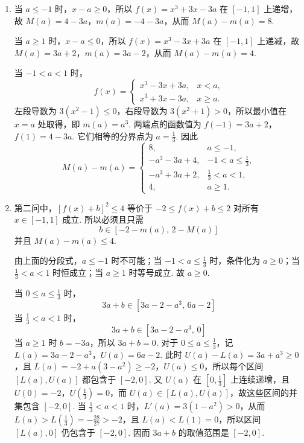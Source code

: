 \begin{solution}
\begin{enumerate}
\item
当 \(a\leqslant-1\) 时，\(x-a\geqslant0\)，所以
\(f(x)=x^3+3x-3a\) 在 \([-1,1]\) 上递增，故
\(M(a)=4-3a\)，\(m(a)=-4-3a\)，从而 \(M(a)-m(a)=8\).

当 \(a\geqslant1\) 时，\(x-a\leqslant0\)，所以
\(f(x)=x^3-3x+3a\) 在 \([-1,1]\) 上递减，故
\(M(a)=3a+2\)，\(m(a)=3a-2\)，从而 \(M(a)-m(a)=4\).

当 \(-1<a<1\) 时，
\[
f(x)=
\begin{cases}
x^3-3x+3a,&x<a,\\
x^3+3x-3a,&x\geqslant a.
\end{cases}
\]
左段导数为 \(3(x^2-1)\leqslant0\)，右段导数为 \(3(x^2+1)>0\)，所以最小值在 \(x=a\) 处取得，即 \(m(a)=a^3\). 两端点的函数值为 \(f(-1)=3a+2\)，\(f(1)=4-3a\). 它们相等的分界点为 \(a=\frac13\). 因此
\[
M(a)-m(a)=
\begin{cases}
8,&a\leqslant-1,\\
-a^3-3a+4,&-1<a\leqslant\frac13,\\
-a^3+3a+2,&\frac13<a<1,\\
4,&a\geqslant1.
\end{cases}
\]

\item
第二问中，\([f(x)+b]^2\leqslant4\) 等价于 \(-2\leqslant f(x)+b\leqslant2\) 对所有 \(x\in[-1,1]\) 成立. 所以必须且只需
\[
b\in[-2-m(a),\,2-M(a)]
\]
并且 \(M(a)-m(a)\leqslant4\).

由上面的分段式，\(a\leqslant-1\) 时不可能；当 \(-1<a\leqslant\frac13\) 时，条件化为 \(a\geqslant0\)；当 \(\frac13<a<1\) 时恒成立；当 \(a\geqslant1\) 时等号成立. 故 \(a\geqslant0\).

当 \(0\leqslant a\leqslant\frac13\) 时，
\[
3a+b\in[3a-2-a^3,\,6a-2]
\]
当 \(\frac13<a<1\) 时，
\[
3a+b\in[3a-2-a^3,\,0]
\]
当 \(a\geqslant1\) 时 \(b=-3a\)，所以 \(3a+b=0\). 对于 \(0\leqslant a\leqslant\frac13\)，记 \(L(a)=3a-2-a^3\)，\(U(a)=6a-2\). 此时 \(U(a)-L(a)=3a+a^3\geqslant0\)，且 \(L(a)=-2+a(3-a^2)\geqslant-2\)，\(U(a)\leqslant0\)，所以每个区间 \([L(a),U(a)]\) 都包含于 \([-2,0]\). 又 \(U(a)\) 在 \([0,\frac13]\) 上连续递增，且 \(U(0)=-2\)，\(U(\frac13)=0\)，而 \(U(a)\in[L(a),U(a)]\)，故这些区间的并集包含 \([-2,0]\). 当 \(\frac13<a<1\) 时，\(L'(a)=3(1-a^2)>0\)，从而 \(L(a)>L(\frac13)=-\frac{28}{27}>-2\)，且 \(L(a)<L(1)=0\)，所以区间 \([L(a),0]\) 仍包含于 \([-2,0]\). 因而 \(3a+b\) 的取值范围是 \([-2,0]\).
\end{enumerate}
\end{solution}
